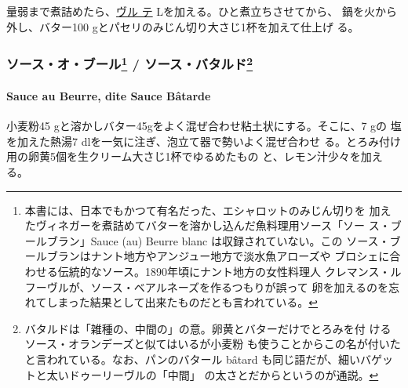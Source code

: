\begin{recette}
\deuxtiers{}量弱まで煮詰めたら、\protect\hyperlink{veloute-de-poisson}{ヴル
テ}\troisquarts{} Lを加える。ひと煮立ちさせてから、
鍋を火から外し、バター100 gとパセリのみじん切り大さじ1杯を加えて仕上げ
る。

\maeaki

\hypertarget{ux30bdux30fcux30b9ux30aaux30d6ux30fcux30eb16-ux30bdux30fcux30b9ux30d0ux30bfux30ebux30c914}{%
\subsubsection[ソース・オ・ブール /
ソース・バタルド]{\texorpdfstring{ソース・オ・ブール\footnote{本書には、日本でもかつて有名だった、エシャロットのみじん切りを
  加えたヴィネガーを煮詰めてバターを溶かし込んだ魚料理用ソース「ソー
  ス・ブールブラン」Sauce (au) Beurre blanc は収録されていない。この
  ソース・ブールブランはナント地方やアンジュー地方で淡水魚アローズや
  ブロシェに合わせる伝統的なソース。1890年頃にナント地方の女性料理人
  クレマンス・ルフーヴルが、ソース・ベアルネーズを作るつもりが誤って
  卵を加えるのを忘れてしまった結果として出来たものだとも言われている。}
/ ソース・バタルド\footnote{バタルドは「雑種の、中間の」の意。卵黄とバターだけでとろみを付
  ける\protect\hypertarget{sauce-hollandaise}{}{ソース・オランデーズ}と似てはいるが小麦粉
  も使うことからこの名が付いたと言われている。なお、パンのバタール
  bâtard も同じ語だが、細いバゲットと太いドゥーリーヴルの「中間」
  の太さとだからというのが通説。}}{ソース・オ・ブール / ソース・バタルド}}\label{ux30bdux30fcux30b9ux30aaux30d6ux30fcux30eb16-ux30bdux30fcux30b9ux30d0ux30bfux30ebux30c914}}

\hypertarget{sauce-au-beurre}{%
\paragraph{Sauce au Beurre, dite Sauce Bâtarde}\label{sauce-au-beurre}}


小麦粉45 gと溶かしバター45gをよく混ぜ合わせ粘土状にする。そこに、7 gの
塩を加えた熱湯7\undemi{} dlを一気に注ぎ、泡立て器で勢いよく混ぜ合わせ
る。とろみ付け用の卵黄5個を生クリーム大さじ1\undemi{}杯でゆるめたもの
と、レモン汁少々を加える。


\end{recette}
